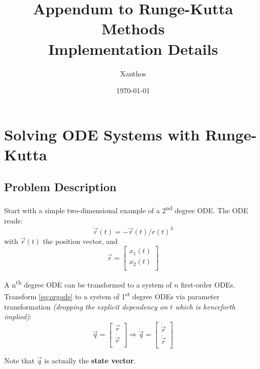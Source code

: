 \documentclass[12pt,a4paper,twoside]{report}
\title{Appendum to Runge-Kutta Methods\\Implementation Details}
\author{Xanthos}
\date{\today}
\begin{document}
\begin{titlepage}
\maketitle
\end{titlepage}


\section{Solving ODE Systems with Runge-Kutta}
\subsection{Problem Description}
\label{ssec:problem-description}
Start with a simple two-dimensional example of a 2\textsuperscript{nd} degree ODE.
The ODE reads:
\begin{equation}
  \label{eq:orgode}
  \ddot{\vec{r}}(t) = - \vec{r}(t) / {r(t)}^3
\end{equation}
with \( \vec{r}(t) \) the position vector, and
\begin{equation}
  \vec{r} = 
  \begin{bmatrix}
  x_{1}(t) \\
  x_{2}(t) \\
  \end{bmatrix}
\end{equation}

A n\textsuperscript{th} degree ODE can be transformed to a system of \(n\) first-order ODEs.
Transform \ref{eq:orgode} to a system of 1\textsuperscript{st} degree ODEs via parameter transformation 
\textit{(dropping the explicit dependency on \(t\) which is henceforth implied)}:
\begin{equation}
  \vec{q} = 
  \begin{bmatrix}
    \vec{r} \\
    \dot{\vec{r}} \\
  \end{bmatrix}
\Rightarrow
  \dot{\vec{q}} = 
  \begin{bmatrix}
    \dot{\vec{r}} \\
    \ddot{\vec{r}} \\
  \end{bmatrix}
\end{equation}

Note that \( \vec{q} \) is actually the \textbf{state vector}.
\end{document}
